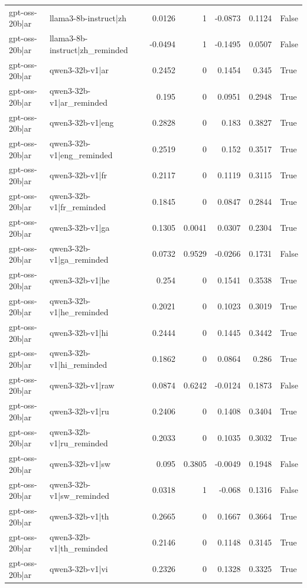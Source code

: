 \begin{table}
\begin{tabular}{l l r r r r l}
gpt-oss-20b|ar & llama3-8b-instruct|zh & 0.0126 & 1 & -0.0873 & 0.1124 & False \\
gpt-oss-20b|ar & llama3-8b-instruct|zh_reminded & -0.0494 & 1 & -0.1495 & 0.0507 & False \\
gpt-oss-20b|ar & qwen3-32b-v1|ar & 0.2452 & 0 & 0.1454 & 0.345 & True \\
gpt-oss-20b|ar & qwen3-32b-v1|ar_reminded & 0.195 & 0 & 0.0951 & 0.2948 & True \\
gpt-oss-20b|ar & qwen3-32b-v1|eng & 0.2828 & 0 & 0.183 & 0.3827 & True \\
gpt-oss-20b|ar & qwen3-32b-v1|eng_reminded & 0.2519 & 0 & 0.152 & 0.3517 & True \\
gpt-oss-20b|ar & qwen3-32b-v1|fr & 0.2117 & 0 & 0.1119 & 0.3115 & True \\
gpt-oss-20b|ar & qwen3-32b-v1|fr_reminded & 0.1845 & 0 & 0.0847 & 0.2844 & True \\
gpt-oss-20b|ar & qwen3-32b-v1|ga & 0.1305 & 0.0041 & 0.0307 & 0.2304 & True \\
gpt-oss-20b|ar & qwen3-32b-v1|ga_reminded & 0.0732 & 0.9529 & -0.0266 & 0.1731 & False \\
gpt-oss-20b|ar & qwen3-32b-v1|he & 0.254 & 0 & 0.1541 & 0.3538 & True \\
gpt-oss-20b|ar & qwen3-32b-v1|he_reminded & 0.2021 & 0 & 0.1023 & 0.3019 & True \\
gpt-oss-20b|ar & qwen3-32b-v1|hi & 0.2444 & 0 & 0.1445 & 0.3442 & True \\
gpt-oss-20b|ar & qwen3-32b-v1|hi_reminded & 0.1862 & 0 & 0.0864 & 0.286 & True \\
gpt-oss-20b|ar & qwen3-32b-v1|raw & 0.0874 & 0.6242 & -0.0124 & 0.1873 & False \\
gpt-oss-20b|ar & qwen3-32b-v1|ru & 0.2406 & 0 & 0.1408 & 0.3404 & True \\
gpt-oss-20b|ar & qwen3-32b-v1|ru_reminded & 0.2033 & 0 & 0.1035 & 0.3032 & True \\
gpt-oss-20b|ar & qwen3-32b-v1|sw & 0.095 & 0.3805 & -0.0049 & 0.1948 & False \\
gpt-oss-20b|ar & qwen3-32b-v1|sw_reminded & 0.0318 & 1 & -0.068 & 0.1316 & False \\
gpt-oss-20b|ar & qwen3-32b-v1|th & 0.2665 & 0 & 0.1667 & 0.3664 & True \\
gpt-oss-20b|ar & qwen3-32b-v1|th_reminded & 0.2146 & 0 & 0.1148 & 0.3145 & True \\
gpt-oss-20b|ar & qwen3-32b-v1|vi & 0.2326 & 0 & 0.1328 & 0.3325 & True \\

\end{tabular}
\end{table}
